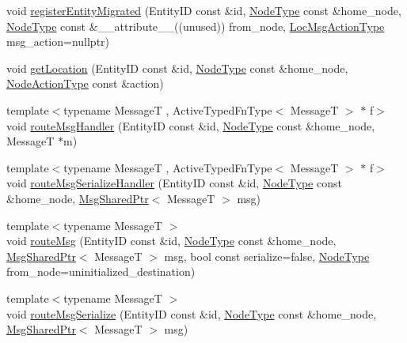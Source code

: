 \begin{DoxyCompactItemize}
\item 
void \hyperlink{structvt_1_1location_1_1_entity_location_coord_a4ac3edf13b0b6310b53d8a123c034a22}{register\+Entity\+Migrated} (Entity\+ID const \&id, \hyperlink{namespacevt_a866da9d0efc19c0a1ce79e9e492f47e2}{Node\+Type} const \&home\+\_\+node, \hyperlink{namespacevt_a866da9d0efc19c0a1ce79e9e492f47e2}{Node\+Type} const \&\+\_\+\+\_\+attribute\+\_\+\+\_\+((unused)) from\+\_\+node, \hyperlink{namespacevt_1_1location_ad0a130e4d79e745543925240e13e8f08}{Loc\+Msg\+Action\+Type} msg\+\_\+action=nullptr)
\item 
void \hyperlink{structvt_1_1location_1_1_entity_location_coord_a129f501be83c7fceb47466c34d733248}{get\+Location} (Entity\+ID const \&id, \hyperlink{namespacevt_a866da9d0efc19c0a1ce79e9e492f47e2}{Node\+Type} const \&home\+\_\+node, \hyperlink{namespacevt_1_1location_a3a9235e0ceb341bef225d2cc46606e9e}{Node\+Action\+Type} const \&action)
\item 
{\footnotesize template$<$typename MessageT , Active\+Typed\+Fn\+Type$<$ Message\+T $>$ $\ast$ f$>$ }\\void \hyperlink{structvt_1_1location_1_1_entity_location_coord_a0432bf605db83627c15e2c53920aff97}{route\+Msg\+Handler} (Entity\+ID const \&id, \hyperlink{namespacevt_a866da9d0efc19c0a1ce79e9e492f47e2}{Node\+Type} const \&home\+\_\+node, MessageT $\ast$m)
\item 
{\footnotesize template$<$typename MessageT , Active\+Typed\+Fn\+Type$<$ Message\+T $>$ $\ast$ f$>$ }\\void \hyperlink{structvt_1_1location_1_1_entity_location_coord_ad0465263fbb33cf63819fd2c86f10cec}{route\+Msg\+Serialize\+Handler} (Entity\+ID const \&id, \hyperlink{namespacevt_a866da9d0efc19c0a1ce79e9e492f47e2}{Node\+Type} const \&home\+\_\+node, \hyperlink{namespacevt_ab2b3d506ec8e8d1540aede826d84a239}{Msg\+Shared\+Ptr}$<$ MessageT $>$ msg)
\item 
{\footnotesize template$<$typename MessageT $>$ }\\void \hyperlink{structvt_1_1location_1_1_entity_location_coord_af447be2a20fef8a60afd73a6eb05bfc7}{route\+Msg} (Entity\+ID const \&id, \hyperlink{namespacevt_a866da9d0efc19c0a1ce79e9e492f47e2}{Node\+Type} const \&home\+\_\+node, \hyperlink{namespacevt_ab2b3d506ec8e8d1540aede826d84a239}{Msg\+Shared\+Ptr}$<$ MessageT $>$ msg, bool const serialize=false, \hyperlink{namespacevt_a866da9d0efc19c0a1ce79e9e492f47e2}{Node\+Type} from\+\_\+node=uninitialized\+\_\+destination)
\item 
{\footnotesize template$<$typename MessageT $>$ }\\void \hyperlink{structvt_1_1location_1_1_entity_location_coord_a1a1d8dfa9ac9fdceadb5c2ef9b9cecb6}{route\+Msg\+Serialize} (Entity\+ID const \&id, \hyperlink{namespacevt_a866da9d0efc19c0a1ce79e9e492f47e2}{Node\+Type} const \&home\+\_\+node, \hyperlink{namespacevt_ab2b3d506ec8e8d1540aede826d84a239}{Msg\+Shared\+Ptr}$<$ MessageT $>$ msg)

\end{DoxyCompactItemize}
